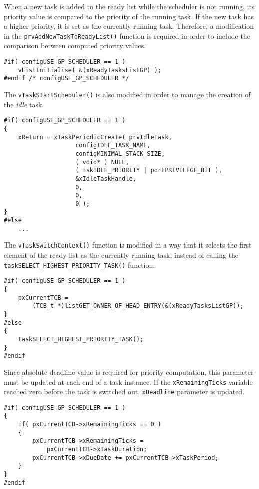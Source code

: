 When a new task is added to the ready list while the scheduler is not running, its priority value is compared to the priority of the running task. 
If the new task has a higher priority, it is set as the currently running task.
Therefore, a modification in the \verb$prvAddNewTaskToReadyList()$ function is required in order to include the comparison between computed priority values. 
\begin{lstlisting}[frame=none, label={newtask}, caption={Modification of the \texttt{prvAddNewTaskToReadyList()} function.}, captionpos=b]
#if( configUSE_GP_SCHEDULER == 1 )
	vListInitialise( &(xReadyTasksListGP) );
#endif /* configUSE_GP_SCHEDULER */
\end{lstlisting}
The \verb$vTaskStartScheduler()$ is also modified in order to manage the creation of the \textit{idle} task.
\begin{lstlisting}[frame=none, label={idle}, caption={Creation of the \textit{idle} task.}, captionpos=b]
#if( configUSE_GP_SCHEDULER == 1 )
{
	xReturn = xTaskPeriodicCreate( prvIdleTask,
					configIDLE_TASK_NAME,
					configMINIMAL_STACK_SIZE,
					( void* ) NULL,
					( tskIDLE_PRIORITY | portPRIVILEGE_BIT ),
					&xIdleTaskHandle,
					0,
					0,
					0 );
}
#else 
	...
\end{lstlisting}
The \verb$vTaskSwitchContext()$ function is modified in a way that it selects the first element of the ready list as the currently running task, instead of calling the \\\verb$taskSELECT_HIGHEST_PRIORITY_TASK()$ function.
\begin{lstlisting}[frame=none, label={switchcontext}, caption={\texttt{vTaskSwitchContext()} modification.}, captionpos=b]
#if( configUSE_GP_SCHEDULER == 1 )
{
	pxCurrentTCB =
		(TCB_t *)listGET_OWNER_OF_HEAD_ENTRY(&(xReadyTasksListGP));
}
#else 
{
	taskSELECT_HIGHEST_PRIORITY_TASK();
}
#endif
\end{lstlisting} 
Since absolute deadline value is required for priority computation, this parameter must be updated at each end of a task instance.
If the \verb$xRemainingTicks$ variable reached zero before the task is switched out, \verb$xDeadline$ parameter is updated.
\begin{lstlisting}[frame=none, label={taskfinish}, caption={\texttt{Updating the \texttt{xDeadline} parameter at the end of task instance}.}, captionpos=b]
#if( configUSE_GP_SCHEDULER == 1 )
{
	if( pxCurrentTCB->xRemainingTicks == 0 ) 
	{
		pxCurrentTCB->xRemainingTicks = 
			pxCurrentTCB->xTaskDuration;
		pxCurrentTCB->xDueDate += pxCurrentTCB->xTaskPeriod;
	}
}
#endif
\end{lstlisting}
